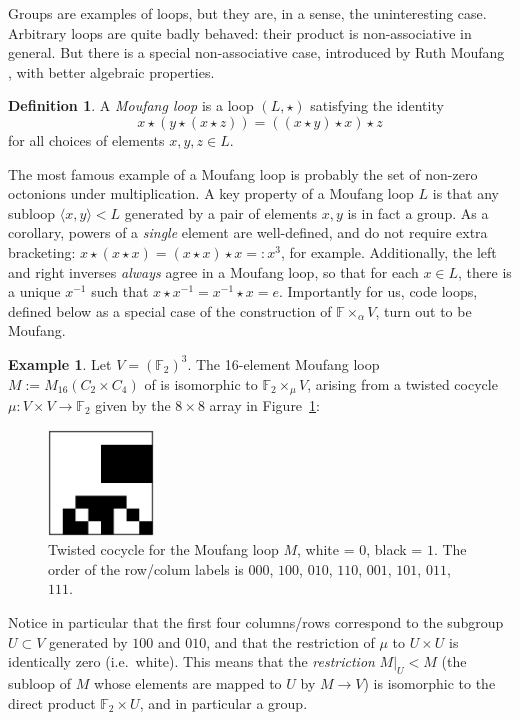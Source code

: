 \documentclass{article}
\theoremstyle{plain}
\theoremstyle{definition}
\newtheorem*{definition}{Definition}
\newtheorem{example}{Example}
\def \FF {\mathbb{F}}
\begin{document}
Groups are examples of loops, but they are, in a sense, the uninteresting case. 
Arbitrary loops are quite badly behaved: their product is non-associative in general. 
But there is a special non-associative case, introduced by Ruth Moufang \cite{Moufang}, with better algebraic properties.

\begin{definition}
A \emph{Moufang loop} is a loop $(L,\star)$ satisfying the identity
\[
x \star (y \star (x \star z)) = ((x \star y) \star x) \star z
\]
for all choices of elements $x,y,z\in L$.
\end{definition}

The most famous example of a Moufang loop is probably the set of non-zero octonions under multiplication. 
A key property of a Moufang loop $L$ is that any subloop $\langle x,y\rangle < L$ generated by a pair of elements $x,y$ is in fact a group. 
As a corollary, powers of a \emph{single} element are well-defined, and do not require extra bracketing: $x\star (x \star x) = (x\star x) \star x =: x^3$, for example. 
Additionally, the left and right inverses \emph{always} agree in a Moufang loop, so that for each $x\in L$, there is a unique $x^{-1}$ such that $x\star x^{-1} = x^{-1}\star x = e$. 
Importantly for us, code loops, defined below as a special case of the construction of $\FF\times_\alpha V$, turn out to be Moufang.

\begin{example}\label{example:m16}
Let $V= (\FF_2)^3$. The 16-element Moufang loop $M := M_{16}(C_2\times C_4)$ of \cite[Theorem 2]{Chein} is isomorphic to $\FF_2 \times_\mu V$,  arising from a twisted cocycle $\mu\colon V\times V\to\FF_2$ given by the $8\times 8$ array in Figure~\ref{fig:cocycle for M}:
\medskip
\begin{figure}[!hb]
\begin{center}
\includegraphics[width=0.25\textwidth]{m16.png}
\end{center}
\caption{Twisted cocycle for the Moufang loop $M$, white = $0$, black = $1$. The order of the row/colum labels is $000$, $100$, $010$, $110$, $001$, $101$, $011$, $111$. }\label{fig:cocycle for M}
\end{figure}


Notice in particular that the first four columns/rows correspond to the subgroup $U\subset V$ generated by $100$ and $010$, and that the restriction of $\mu$ to $U\times U$ is identically zero (i.e.\ white). 
This means that the \emph{restriction} $M\big|_U < M$ (the subloop of $M$ whose elements are mapped to $U$ by $M \to V$) is isomorphic to the direct product $\FF_2\times U$, and in particular a group.
\end{example}
\end{document}
